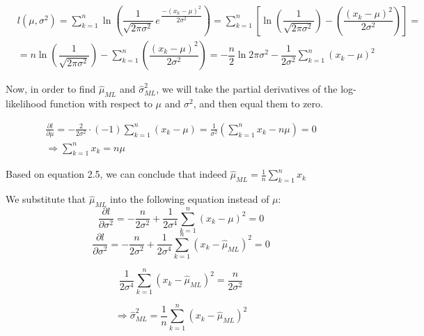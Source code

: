 \documentclass{homework2_template}
\begin{document}
\begin{equation}
\begin{split}
& l(\mu,\sigma^2) = \sum_{k=1}^n\ln \left(\dfrac{1}{\sqrt{2 \pi \sigma^2}}\, e^{\,\dfrac{-(x_k- \mu)^2}{2\sigma^2}}\right) = \sum_{k=1}^n\left[ \ln \left(\dfrac{1}{\sqrt{2 \pi \sigma^2}}\right) -\left(\dfrac{(x_k-\mu)^2}{2\sigma^2}\right)\right] = \\
& = n\ln \left( \dfrac{1}{\sqrt{2\pi \sigma^2}}\right) - \sum_{k=1}^n\left(\dfrac{(x_k-\mu)^2}{2\sigma^2}\right)
= -\dfrac{n}{2}\ln 2\pi\sigma^2 - \dfrac{1}{{2\sigma^2}}\sum_{k=1}^n (x_k-\mu)^2
\end{split}
\end{equation}

Now, in order to find $\hat{\mu}_{ML}$ and $\hat{\sigma}_{ML}^2$, we will take the partial derivatives of the log-likelihood function with respect to $\mu$ and $\sigma^2$, and then equal them to zero.

\begin{equation}
\begin{gathered}
\frac{\partial l}{\partial \mu} = -\frac{2}{2\sigma^2}\cdot (-1) \sum_{k=1}^n (x_k - \mu) = \frac{1}{\sigma^2}\left(\sum_{k=1}^n x_k - n\mu\right) = 0 \\
\Rightarrow \sum_{k=1}^n x_k = n\mu
\end{gathered}
\end{equation}

Based on equation 2.5, we can conclude that indeed {\large$\hat{\mu}_{ML} = \frac{1}{n} \sum_{k=1}^n x_k$}

We substitute that $\hat{\mu}_{ML}$ into the following equation instead of $\mu$:
\begin{equation}
\frac{\partial l}{\partial \sigma^2} = -\frac{n}{2\sigma^2} + \frac{1}{2\sigma^4} \sum_{k=1}^n (x_k - \mu)^2 = 0
\end{equation}
\begin{equation}
\frac{\partial l}{\partial \sigma^2} = -\frac{n}{2\sigma^2} + \frac{1}{2\sigma^4} \sum_{k=1}^n (x_k - \hat{\mu}_{ML})^2 = 0
\end{equation}

\begin{equation}
\frac{1}{2\sigma^4} \sum_{k=1}^n (x_k - \hat{\mu}_{ML})^2 = \frac{n}{2\sigma^2}
\end{equation}

\begin{equation}
\Rightarrow \hat{\sigma}_{ML}^2 = \frac{1}{n} \sum_{k=1}^n (x_k - \hat{\mu}_{ML})^2
\end{equation}
\end{document}
